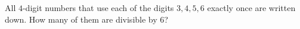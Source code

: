 All $4$-digit numbers that use each of the digits $3,4,5,6$ exactly once are written down. How many of them are divisible by $6$?
